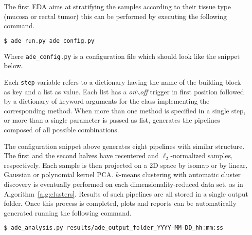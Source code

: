 The first EDA aims at stratifying the samples according to their tissue type (mucosa or rectal tumor) this can be performed by executing the following command.

{\footnotesize
\begin{lstlisting}[language=bash,caption={ }]
$ ade_run.py ade_config.py
\end{lstlisting}
}

\noindent Where \texttt{{\footnotesize ade\_config.py}} is a configuration file which should look like the snippet below.



\noindent Each \texttt{step} variable refers to a dictionary having the name of the building block as key and a list as value. Each list has a \emph{on$\backslash$off} trigger in first position followed by a dictionary of keyword arguments for the class implementing the corresponding method. When more than one method is specified in a single step, or more than a single parameter is passed as {list}, \ade generates the pipelines composed of all possible combinations.

The configuration snippet above generates eight pipelines with similar structure. The first and the second halves have recentered and $\ell_2$-normalized samples, respectively. Each sample is then projected on a 2D space by isomap or by linear, Gaussian or polynomial kernel PCA. $k$-means clustering with automatic cluster discovery is eventually performed on each dimensionality-reduced data set, as in Algorithm~\ref{alg:clusters}.
Results of such pipelines are all stored in a single output folder. Once this process is completed, plots and reports can be automatically generated running the following command.

{\footnotesize
\begin{lstlisting}[language=bash,caption={ }]
  $ ade_analysis.py results/ade_output_folder_YYYY-MM-DD_hh:mm:ss
\end{lstlisting}
}



